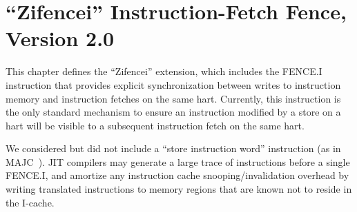 \chapter{``Zifencei'' Instruction-Fetch Fence, Version 2.0}
\label{chap:zifencei}

This chapter defines the ``Zifencei'' extension, which includes the
FENCE.I instruction that provides explicit synchronization between
writes to instruction memory and instruction fetches on the same hart.
Currently, this instruction is the only standard mechanism to ensure
an instruction modified by a store on a hart will be visible to a
subsequent instruction fetch on the same hart.

\begin{commentary}
We considered but did not include a ``store instruction word''
instruction (as in MAJC~\cite{majc}).  JIT compilers may generate a
large trace of instructions before a single FENCE.I, and amortize any
instruction cache snooping/invalidation overhead by writing translated
instructions to memory regions that are known not to reside in the
I-cache.
\end{commentary}

